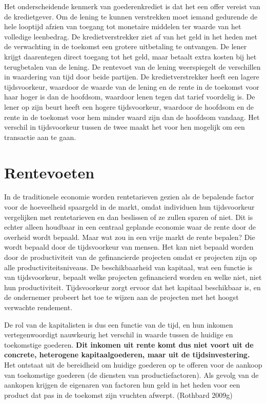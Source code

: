 \documentclass[
  a5paper,
  smalldemyvopaper,11pt,twoside,onecolumn,openright,extrafontsizes,
hidelinks]{memoir}
\begin{document}
Het onderscheidende kenmerk van goederenkrediet is dat het een offer
vereist van de kredietgever. Om de lening te kunnen verstrekken moet
iemand gedurende de hele looptijd afzien van toegang tot monetaire
middelen ter waarde van het volledige leenbedrag. De kredietverstrekker
ziet af van het geld in het heden met de verwachting in de toekomst een
grotere uitbetaling te ontvangen. De lener krijgt daarentegen direct
toegang tot het geld, maar betaalt extra kosten bij het terugbetalen van
de lening. De rentevoet van de lening weerspiegelt de verschillen in
waardering van tijd door beide partijen. De kredietverstrekker heeft een
lagere tijdsvoorkeur, waardoor de waarde van de lening en de rente in de
toekomst voor haar hoger is dan de hoofdsom, waardoor lenen tegen dat
tarief voordelig is. De lener op zijn beurt heeft een hogere
tijdsvoorkeur, waardoor de hoofdsom en de rente in de toekomst voor hem
minder waard zijn dan de hoofdsom vandaag. Het verschil in tijdsvoorkeur
tussen de twee maakt het voor hen mogelijk om een transactie aan te
gaan.

\section{Rentevoeten}\label{rentevoeten}

In de traditionele economie worden rentetarieven gezien als de bepalende
factor voor de hoeveelheid spaargeld in de markt, omdat individuen hun
tijdsvoorkeur vergelijken met rentetarieven en dan beslissen of ze
zullen sparen of niet. Dit is echter alleen houdbaar in een centraal
geplande economie waar de rente door de overheid wordt bepaald. Maar wat
zou in een vrije markt de rente bepalen? Die wordt bepaald door de
tijdsvoorkeur van mensen. Het kan niet bepaald worden door de
productiviteit van de gefinancierde projecten omdat er projecten zijn op
alle productiviteitsniveaus. De beschikbaarheid van kapitaal, wat een
functie is van tijdsvoorkeur, bepaalt welke projecten gefinancierd
worden en welke niet, niet hun productiviteit. Tijdsvoorkeur zorgt
ervoor dat het kapitaal beschikbaar is, en de ondernemer probeert het
toe te wijzen aan de projecten met het hoogst verwachte rendement.

De rol van de kapitalisten is dus een functie van de tijd, en hun
inkomen vertegenwoordigt nauwkeurig het verschil in waarde tussen de
huidige en toekomstige goederen. \textbf{Dit inkomen uit rente komt dus
niet voort uit de concrete, heterogene kapitaalgoederen, maar uit de
tijdsinvestering.} Het ontstaat uit de bereidheid om huidige goederen op
te offeren voor de aankoop van toekomstige goederen (de diensten van
productiefactoren). Als gevolg van de aankopen krijgen de eigenaren van
factoren hun geld in het heden voor een product dat pas in de toekomst
zijn vruchten afwerpt. (Rothbard 2009g)
\end{document}
